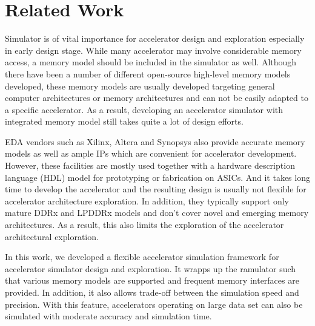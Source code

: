 \section{Related Work} \label{sec:relatedwork}
Simulator is of vital importance for accelerator design and exploration especially in 
early design stage. While many accelerator may involve considerable memory access, a memory 
model should be included in the simulator as well. Although there have been a number of 
different open-source high-level memory models developed, these memory models are usually developed 
targeting general computer architectures or memory architectures and can not be easily 
adapted to a specific accelerator. As a result, developing an 
accelerator simulator with integrated memory model still takes quite a lot 
of design efforts. 

EDA vendors such as Xilinx, Altera and Synopsys also provide accurate memory models 
as well as ample IPs which are convenient for accelerator development. However, these facilities 
are mostly used together with a hardware description language (HDL) model for prototyping or 
fabrication on ASICs. And it takes long time to develop the accelerator and the resulting design 
is usually not flexible for accelerator architecture exploration. In addition, they typically 
support only mature DDRx and LPDDRx models and don't cover novel and emerging memory architectures.
As a result, this also limits the exploration of the accelerator architectural exploration.

In this work, we developed a flexible accelerator simulation framework for accelerator 
simulator design and exploration. It wrapps up the ramulator such that various memory 
models are supported and frequent memory interfaces are provided. In addition, it also 
allows trade-off between the simulation speed and precision. With this feature, accelerators 
operating on large data set can also be simulated with moderate accuracy and simulation time. 
